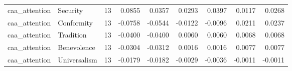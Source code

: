 \begin{tabular}{llrrrrrrr}
caa\_attention & Security & 13 & 0.0855 & 0.0357 & 0.0293 & 0.0397 & 0.0117 & 0.0268 \\
caa\_attention & Conformity & 13 & -0.0758 & -0.0544 & -0.0122 & -0.0096 & 0.0211 & 0.0237 \\
caa\_attention & Tradition & 13 & -0.0400 & -0.0400 & 0.0060 & 0.0060 & 0.0068 & 0.0068 \\
caa\_attention & Benevolence & 13 & -0.0304 & -0.0312 & 0.0016 & 0.0016 & 0.0077 & 0.0077 \\
caa\_attention & Universalism & 13 & -0.0179 & -0.0182 & -0.0029 & -0.0036 & -0.0011 & -0.0011 \\
\bottomrule
\end{tabular}

